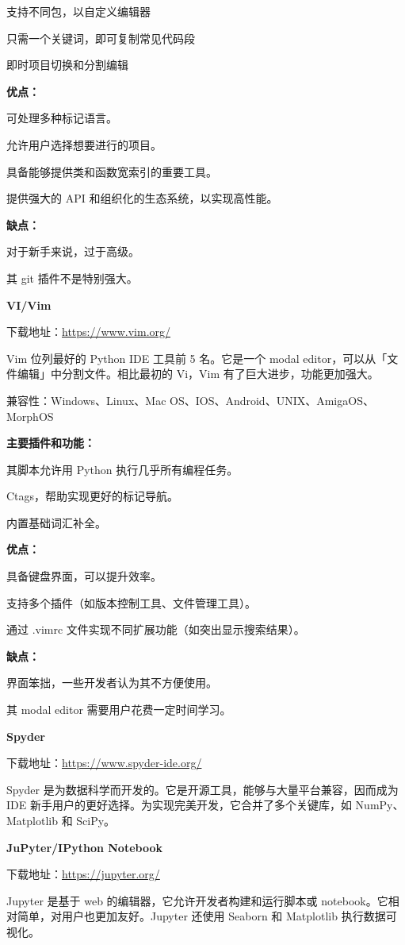 \documentclass[]{ctexbook}
\begin{document}
支持不同包，以自定义编辑器

只需一个关键词，即可复制常见代码段

即时项目切换和分割编辑

\textbf{优点：}

可处理多种标记语言。

允许用户选择想要进行的项目。

具备能够提供类和函数宽索引的重要工具。

提供强大的 API 和组织化的生态系统，以实现高性能。

\textbf{缺点：}

对于新手来说，过于高级。

其 git 插件不是特别强大。

\textbf{VI/Vim}

下载地址：\url{https://www.vim.org/}

Vim 位列最好的 Python IDE 工具前 5 名。它是一个 modal editor，可以从「文件编辑」中分割文件。相比最初的 Vi，Vim 有了巨大进步，功能更加强大。

兼容性：Windows、Linux、Mac OS、IOS、Android、UNIX、AmigaOS、MorphOS

\textbf{主要插件和功能：}

其脚本允许用 Python 执行几乎所有编程任务。

Ctags，帮助实现更好的标记导航。

内置基础词汇补全。

\textbf{优点：}

具备键盘界面，可以提升效率。

支持多个插件（如版本控制工具、文件管理工具）。

通过 .vimrc 文件实现不同扩展功能（如突出显示搜索结果）。

\textbf{缺点：}

界面笨拙，一些开发者认为其不方便使用。

其 modal editor 需要用户花费一定时间学习。

\textbf{Spyder}

下载地址：\url{https://www.spyder-ide.org/}

Spyder 是为数据科学而开发的。它是开源工具，能够与大量平台兼容，因而成为 IDE 新手用户的更好选择。为实现完美开发，它合并了多个关键库，如 NumPy、Matplotlib 和 SciPy。

\textbf{JuPyter/IPython Notebook}

下载地址：\url{https://jupyter.org/}

Jupyter 是基于 web 的编辑器，它允许开发者构建和运行脚本或 notebook。它相对简单，对用户也更加友好。Jupyter 还使用 Seaborn 和 Matplotlib 执行数据可视化。
\end{document}

